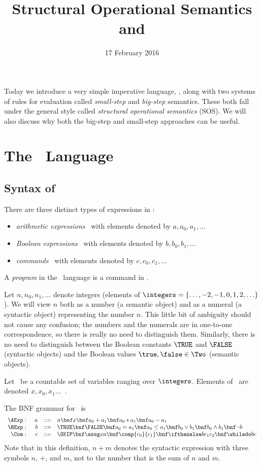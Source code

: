 \title{Structural Operational Semantics and \IMP}
\date{17 February 2016}
\maketitle

Today we introduce a very simple imperative language, \IMP, along with two systems of
rules for evaluation called \emph{small-step} and \emph{big-step} semantics. These
both fall under the general style called \emph{structural operational semantics} (SOS).
We will also discuss why both the big-step and small-step approaches can be useful.

\section{The \IMP\ Language}

\subsection{Syntax of \IMP}

There are three distinct types of expressions in \IMP:
\begin{itemize}
\item \emph{arithmetic expressions} \AExp\ with elements denoted by $a,a_0,a_1,\ldots$
\item \emph{Boolean expressions} \BExp\ with elements denoted by $b,b_0,b_1,\ldots$
\item \emph{commands} \Com\ with elements denoted by $c,c_0,c_1,\ldots$
\end{itemize}
A \emph{program} in the \IMP\ language is a command in \Com.

Let $n,n_0,n_1,\ldots$ denote integers (elements of $\integers=\{\ldots,-2,-1,0,1,2,\ldots\}$). We will view $n$ both as a number (a semantic object) and as a numeral (a syntactic object) representing the number $n$. This little bit of ambiguity should not cause any confusion; the numbers and the numerals are in one-to-one correspondence, so there is really no need to distinguish them. Similarly, there is no need to distinguish between the Boolean constants $\TRUE$ and $\FALSE$ (syntactic objects) and the Boolean values $\true,\false\in\Two$ (semantic objects).

Let \Var\ be a countable set of variables ranging over $\integers$. Elements of \Var\ are denoted $x,x_0,x_1\ldots$~.

The BNF grammar for \IMP\ is
\[
\begin{array}{r@{\hspace{5mm}}rcl}
\AExp: & a & ::= & n \bnf x \bnf a_0+a_1 \bnf a_0*a_1 \bnf a_0-a_1\\
\BExp: & b & ::= & \TRUE \bnf \FALSE \bnf a_0=a_1 \bnf a_0\leq a_1 \bnf b_0\vee b_1 \bnf b_0\wedge b_1 \bnf \neg b\\
\Com: & c & ::= & \SKIP \bnf \assg xa \bnf \comp{c_0}{c_1} \bnf \ifthenelse b{c_1}{c_2} \bnf \whiledo bc
\end{array}
\]
Note that in this definition, $n+m$ denotes the syntactic expression with three symbols $n$, $+$, and $m$, not to the number that is the sum of $n$ and $m$.

